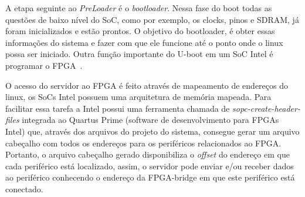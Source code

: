 A etapa seguinte ao \textit{PreLoader} é o \textit{bootloader}. Nessa fase do boot todas as questões de baixo nível do SoC, como por exemplo, os clocks, pinos e SDRAM, já foram inicializados e estão prontos. O objetivo do bootloader, é obter essas informações do sistema e fazer com que ele funcione até o ponto onde o linux possa ser iniciado. Outra função importante do U-boot em um SoC Intel é programar o FPGA~\cite{SocLinux}. 


O acesso do servidor ao FPGA é feito através de mapeamento de endereços do linux, os SoCs Intel possuem uma arquitetura de memória mapeada. Para facilitar essa tarefa a Intel possui uma ferramenta chamada de \textit{sopc-create-header-files} integrada ao Quartus Prime (software de desenvolvimento para FPGAs Intel) que, através dos arquivos do projeto do sistema, consegue gerar um arquivo cabeçalho com todos os endereços para os periféricos relacionados ao FPGA\@. Portanto, o arquivo cabeçalho gerado disponibiliza o \textit{offset} do endereço em que cada periférico está localizado, assim, o servidor pode enviar e/ou receber dados ao periférico conhecendo o endereço da FPGA-bridge em que este periférico está conectado.

